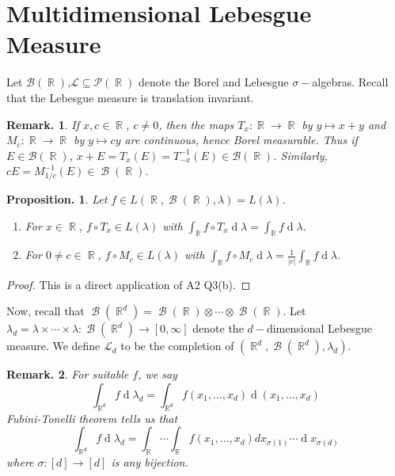 \documentclass[11pt, a4paper]{memoir}
\DeclareMathOperator{\R}{{\mathbb{R}}}
\theoremstyle{change}
\newtheorem{proposition}[theorem]{Proposition.}
\theoremstyle{plain}
\theoremstyle{nonumberplain}
\newtheorem{remark}{Remark.}
\newtheorem{proof}{Proof}
\DeclareMathOperator{\B}{{\mathcal{B}}}
\renewcommand{\d}[1]{\ensuremath{\operatorname{d}\!{#1}}}
\numberwithin{equation}{section}
\begin{document}
\section{Multidimensional Lebesgue Measure}
Let $\mathcal{B}(\R)$,$\mathcal{L}\subseteq\mathcal{P}(\R)$ denote the Borel and Lebesgue $\sigma-$algebras.
Recall that the Lebesgue measure is translation invariant.
\begin{remark}
    If $x,c\in\R$, $c\neq 0$, then the maps $T_x:\R\to\R$ by $y\mapsto x+y$ and $M_c:\R\to\R$ by $y\mapsto cy$ are continuous, hence Borel measurable.
    Thus if $E\in\mathcal{B}(\R)$, $x+E=T_x(E)=T_{-x}^{-1}(E)\in\mathcal{B}(\R)$.
    Similarly, $cE=M_{1/c}^{-1}(E)\in\B(\R)$.
\end{remark}
\begin{proposition}
    Let $f\in L(\R,\B(\R),\lambda)=L(\lambda)$.
    \begin{enumerate}[nolistsep,label=(\roman*)]
        \item For $x\in\R$, $f\circ T_x\in L(\lambda)$ with $\int_{\R}f\circ T_x\d{\lambda}=\int_{\R}f\d{\lambda}$.
        \item For $0\neq c\in\R$, $f\circ M_c\in L(\lambda)$ with $\int_{\R}f\circ M_c\d{\lambda}=\frac{1}{|c|}\int_{\R}f\d{\lambda}$.
    \end{enumerate}
\end{proposition}
\begin{proof}
    This is a direct application of A2 Q3(b).
\end{proof}
Now, recall that $\B(\R^d)=\B(\R)\otimes\cdots\otimes\B(\R)$.
Let $\lambda_d=\lambda\times\cdots\times\lambda:\B(\R^d)\to[0,\infty]$ denote the $d-$dimensional Lebesgue measure.
We define $\mathcal{L}_d$ to be the completion of $(\R^d,\B(\R^d),\lambda_d)$.
\begin{remark}
    For suitable $f$, we say
    \begin{equation*}
        \int_{\R^d}f\d{\lambda_d}=\int_{\R^d}f(x_1,\ldots,x_d)\d{(x_1,\ldots,x_d)}
    \end{equation*}
    Fubini-Tonelli theorem tells us that
    \begin{equation*}
        \int_{\R^d}f\d{\lambda_d}=\int_{\R}\cdots\int_{\R}f(x_1,\ldots,x_d)dx_{\sigma(1)}\cdots\d{x_{\sigma(d)}}
    \end{equation*}
    where $\sigma:[d]\to[d]$ is any bijection.
\end{remark}
\end{document}
